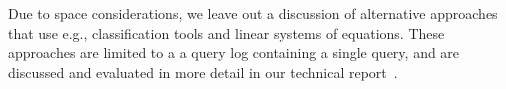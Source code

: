 Due to space considerations, we leave out a discussion of alternative approaches that use e.g., classification tools and linear systems of equations.
These approaches are limited to a a query log containing a single query, and are discussed and evaluated in more detail in our technical report~\cite{qfixarxiv}.





